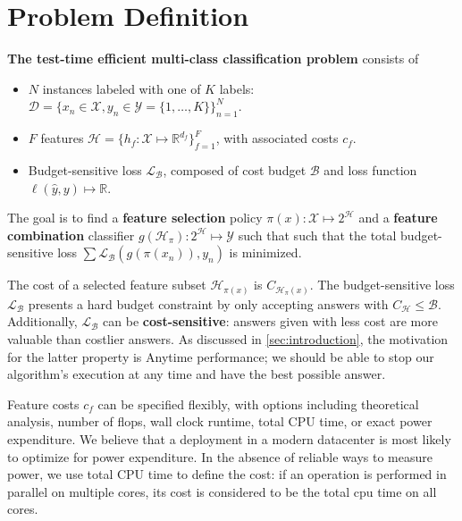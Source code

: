 \section{Problem Definition}\label{sec:clf_problem}

\begin{mydef} \label{def:clf_problem}
\textbf{The test-time efficient multi-class classification problem} consists of

\begin{itemize}
    \item $N$ instances labeled with one of $K$ labels: ${\mathcal{D} = \{x_n \in \mathcal{X}, y_n \in \mathcal{Y} = \{1, \dots, K\}\}_{n=1}^N}$.
    \item $F$ features $\mathcal{H} = \{h_f : \mathcal{X} \mapsto \mathbb{R}^{d_f} \}_{f=1}^F$, with associated costs $c_f$.
    \item Budget-sensitive loss $\mathcal{L}_\mathcal{B}$, composed of cost budget $\mathcal{B}$ and loss function ${\ell(\hat{y}, y) \mapsto \mathbb{R}}$.
\end{itemize}

The goal is to find a \textbf{feature selection} policy $\pi(x): \mathcal{X} \mapsto 2^\mathcal{H}$ and a \textbf{feature combination} classifier $g(\mathcal{H}_\pi) : 2^\mathcal{H} \mapsto \mathcal{Y}$ such that such that the total budget-sensitive loss $\sum \mathcal{L}_\mathcal{B}(g(\pi(x_n)), y_n)$ is minimized.
\end{mydef}

The cost of a selected feature subset $\mathcal{H}_{\pi(x)}$ is $C_{\mathcal{H}_\pi(x)}$.
The budget-sensitive loss $\mathcal{L}_\mathcal{B}$ presents a hard budget constraint by only accepting answers with $C_{\mathcal{H}} \leq \mathcal{B}$.
Additionally, $\mathcal{L}_\mathcal{B}$ can be \textbf{cost-sensitive}: answers given with less cost are more valuable than costlier answers.
As discussed in \autoref{sec:introduction}, the motivation for the latter property is Anytime performance; we should be able to stop our algorithm's execution at any time and have the best possible answer.

Feature costs $c_f$ can be specified flexibly, with options including theoretical analysis, number of flops, wall clock runtime, total CPU time, or exact power expenditure.
We believe that a deployment in a modern datacenter is most likely to optimize for power expenditure.
In the absence of reliable ways to measure power, we use total CPU time to define the cost: if an operation is performed in parallel on multiple cores, its cost is considered to be the total cpu time on all cores.


